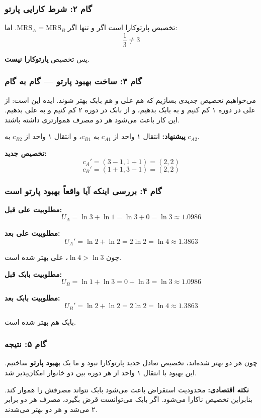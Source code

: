 \documentclass[12pt,a4paper]{article}
\newcommand{\MRS}{\mathrm{MRS}}
\begin{document}
\subsubsection{گام ۲: شرط کارایی پارتو}

تخصیص پارتوکارا است اگر و تنها اگر $\MRS_A = \MRS_B$. اما:
\[
	\frac{1}{3} \neq 3
\]

پس تخصیص \textbf{پارتوکارا نیست}.

\subsubsection{گام ۳: ساخت بهبود پارتو — گام به گام}

می‌خواهیم تخصیص جدیدی بسازیم که هم علی و هم بابک بهتر شوند. ایده این است: از علی در دوره ۱ کم کنیم و به بابک بدهیم، و از بابک در دوره ۲ کم کنیم و به علی بدهیم. این کار باعث می‌شود هر دو مصرف هموارتری داشته باشند.

\textbf{پیشنهاد:} انتقال ۱ واحد از $c_{A1}$ به $c_{B1}$، و انتقال ۱ واحد از $c_{B2}$ به $c_{A2}$.

\textbf{تخصیص جدید:}
\[
	c_A' = (3-1, 1+1) = (2, 2)
\]
\[
	c_B' = (1+1, 3-1) = (2, 2)
\]

\subsubsection{گام ۴: بررسی اینکه آیا واقعاً بهبود پارتو است}

\textbf{مطلوبیت علی قبل:}
\[
	U_A = \ln 3 + \ln 1 = \ln 3 + 0 = \ln 3 \approx 1.0986
\]

\textbf{مطلوبیت علی بعد:}
\[
	U_A' = \ln 2 + \ln 2 = 2 \ln 2 = \ln 4 \approx 1.3863
\]

چون $\ln 4 > \ln 3$، علی بهتر شده است.

\textbf{مطلوبیت بابک قبل:}
\[
	U_B = \ln 1 + \ln 3 = 0 + \ln 3 = \ln 3 \approx 1.0986
\]

\textbf{مطلوبیت بابک بعد:}
\[
	U_B' = \ln 2 + \ln 2 = 2 \ln 2 = \ln 4 \approx 1.3863
\]

بابک هم بهتر شده است.

\subsubsection{گام ۵: نتیجه}

چون هر دو بهتر شده‌اند، تخصیص تعادل جدید پارتوکارا نبود و ما یک \textbf{بهبود پارتو} ساختیم. این بهبود با انتقال ۱ واحد از هر دوره بین دو خانوار امکان‌پذیر شد.

\textbf{نکته اقتصادی:} محدودیت استقراض باعث می‌شود بابک نتواند مصرفش را هموار کند. بنابراین تخصیص ناکارا می‌شود. اگر بابک می‌توانست قرض بگیرد، مصرف هر دو برابر ۲ می‌شد و هر دو بهتر می‌شدند.
\end{document}
